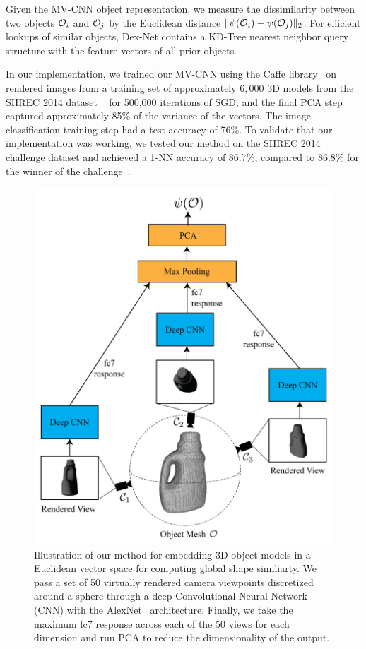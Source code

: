 Given the MV-CNN object representation, we measure the dissimilarity between two objects $\mathcal{O}_i$ and $\mathcal{O}_j$ by the Euclidean distance $\| \psi(\mathcal{O}_i) - \psi(\mathcal{O}_j) \|_2$.
For efficient lookups of similar objects, Dex-Net contains a KD-Tree nearest neighbor query structure with the feature vectors of all prior objects.

In our implementation, we trained our MV-CNN using the Caffe library~\cite{jia2014caffe} on rendered images from a training set of approximately $6,000$ 3D models from the SHREC 2014 dataset ~\cite{li2015comparison} for 500,000 iterations of SGD, and the final PCA step captured approximately 85\% of the variance of the vectors.
The image classification training step had a test accuracy of 76\%.
To validate that our implementation was working, we tested our method on the SHREC 2014 challenge dataset and achieved a 1-NN accuracy of 86.7\%, compared to 86.8\% for the winner of the challenge~\cite{li2015comparison}.

\begin{figure}[t!]
\centering
\includegraphics[scale=0.3]{figures/illustrations/cnn_model.png}
\caption{Illustration of our method for embedding 3D object models in a Euclidean vector space for computing global shape similiarty. We pass a set of 50 virtually rendered camera viewpoints discretized around a sphere through a deep Convolutional Neural Network (CNN) with the AlexNet~\cite{krizhevsky2012imagenet} architecture. Finally, we take the maximum fc7 response across each of the 50 views for each dimension and run PCA to reduce the dimensionality of the output.}
\vspace*{-15pt}
\end{figure}